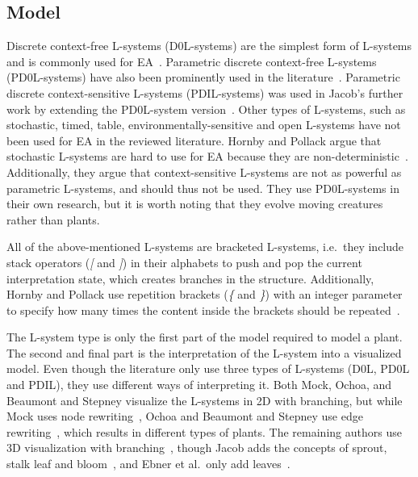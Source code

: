 \subsection{Model}
Discrete context-free L-systems (D0L-systems) are the simplest form of L-systems and is commonly used for EA~\cite{1998Mock,1998Ochoa,2002Ebner,2003Ebner,2006Ashlock,2009Beaumont}.
Parametric discrete context-free L-systems (PD0L-systems) have also been prominently used in the literature~\cite{1994Jacob,2000Vanak,2001Hornby}.
Parametric discrete context-sensitive L-systems (PDIL-systems) was used in Jacob's further work by extending the PD0L-system version~\cite{1995Jacob, 1996Jacob, 1996Jacob-2}.
Other types of L-systems, such as stochastic, timed, table, environmentally-sensitive and open L-systems have not been used for EA in the reviewed literature.
Hornby and Pollack argue that stochastic L-systems are hard to use for EA because they are non-deterministic~\cite{2001Hornby}.
Additionally, they argue that context-sensitive L-systems are not as powerful as parametric L-systems, and should thus not be used.
They use PD0L-systems in their own research, but it is worth noting that they evolve moving creatures rather than plants.

All of the above-mentioned L-systems are bracketed L-systems, i.e.\ they include stack operators (\textit{[} and \textit{]}) in their alphabets to push and pop the current interpretation state, which creates branches in the structure.
Additionally, Hornby and Pollack use repetition brackets (\textit{\{} and \textit{\}}) with an integer parameter to specify how many times the content inside the brackets should be repeated~\cite{2001Hornby}.

The L-system type is only the first part of the model required to model a plant.
The second and final part is the interpretation of the L-system into a visualized model.
Even though the literature only use three types of L-systems (D0L, PD0L and PDIL), they use different ways of interpreting it.
Both Mock, Ochoa, and Beaumont and Stepney visualize the L-systems in 2D with branching, but while Mock uses node rewriting~\cite{1998Mock}, Ochoa and Beaumont and Stepney use edge rewriting~\cite{1998Ochoa,2009Beaumont}, which results in different types of plants.
The remaining authors use 3D visualization with branching~\cite{1994Jacob,2006Ashlock}, though Jacob adds the concepts of sprout, stalk leaf and bloom~\cite{1995Jacob}, and Ebner et al.\ only add leaves~\cite{2002Ebner,2003Ebner}.

